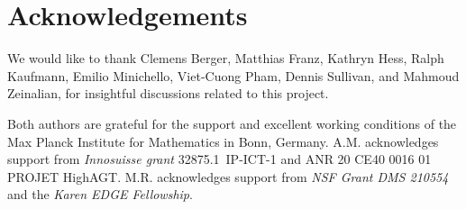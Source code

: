 
\section*{Acknowledgements}

We would like to thank Clemens Berger, Matthias Franz, Kathryn Hess, Ralph Kaufmann, Emilio Minichello, Viet-Cuong Pham, Dennis Sullivan, and Mahmoud Zeinalian, for insightful discussions related to this project.

Both authors are grateful for the support and excellent working conditions of the Max Planck Institute for Mathematics in Bonn, Germany.
A.M. acknowledges support from \textit{Innosuisse grant} \mbox{32875.1 IP-ICT-1} and ANR 20 CE40 0016 01 PROJET HighAGT.
M.R. acknowledges support from \textit{NSF Grant DMS 210554} and the \textit{Karen EDGE Fellowship}.